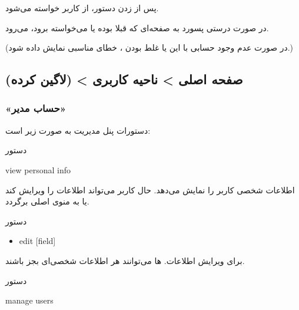 \documentclass[]{article}
\begin{document}
پس از زدن دستور، از کاربر  خواسته می‌شود.

در صورت درستی پسورد به صفحه‌ای که قبلا بوده یا می‌خواسته برود، می‌رود.

(در صورت عدم وجود حسابی با این  یا غلط بودن ،  خطای مناسبی نمایش داده شود.)

\newpage

\subsection*{{\titr صفحه اصلی > ناحیه کاربری > (لاگین کرده)}}

\subsubsection*{{\titr «حساب مدیر»}}

دستورات پنل مدیریت به صورت زیر است:

\begin{mybox}[colback=yellow]{دستور}

\begin{latin}

view personal info

\end{latin}

\end{mybox}

اطلاعات شخصی کاربر را نمایش می‌دهد. حال کاربر می‌تواند اطلاعات را ویرایش کند یا به منوی اصلی برگردد.

\begin{mybox}[colback=yellow]{دستور}


\begin{latin}

\begin{itemize}[label = {$\Rightarrow$}]

\item
edit [field] 

\end{itemize}

\end{latin}

\end{mybox}




برای ویرایش اطلاعات.  ها می‌توانند هر اطلاعات شخصی‌ای بجز  باشند.

\hrulefill


\begin{mybox}[colback=yellow]{دستور}

\begin{latin}

manage users

\end{latin}

\end{mybox}
\end{document}
